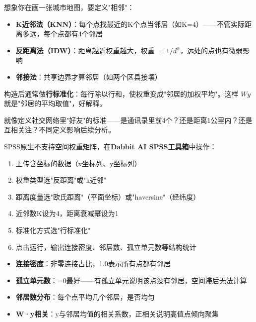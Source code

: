 \begin{algoprinciple}
想象你在画一张城市地图，要定义"相邻"：

\begin{itemize}
    \item \textbf{K近邻法（KNN）}：每个点找最近的K个点当邻居（如K=4）——不管实际距离多远，每个点都有4个邻居
    \item \textbf{反距离法（IDW）}：距离越近权重越大，权重 $=1/d^\alpha$，远处的点也有微弱影响
    \item \textbf{邻接法}：共享边界才算邻居（如两个区县接壤）
\end{itemize}

构造后通常做\textbf{行标准化}：每行除以行和，使权重变成"邻居的加权平均"。这样 $Wy$ 就是"邻居的平均取值"，好解释。

就像定义社交网络里"好友"的标准——是通讯录里前4个？还是距离1公里内？还是互相关注？不同定义影响后续分析。
\end{algoprinciple}

\begin{algosposs}
SPSS原生不支持空间权重矩阵，在\textbf{Dabbit AI SPSS工具箱}中操作：

\begin{enumerate}
    \item 上传含坐标的数据（x坐标列、y坐标列）
    \item 权重类型选"反距离"或"k近邻"
    \item 距离度量选"欧氏距离"（平面坐标）或"haversine"（经纬度）
    \item 近邻数K设为4，距离衰减幂设为1
    \item 标准化方式选"行标准化"
    \item 点击运行，输出连接密度、邻居数、孤立单元数等结构统计
\end{enumerate}
\end{algosposs}

\begin{algoresult}
\begin{itemize}
    \item \textbf{连接密度}：非零连接占比，1.0表示所有点都有邻居
    \item \textbf{孤立单元数}：=0最好——有孤立单元说明该点没有邻居，空间滞后无法计算
    \item \textbf{邻居数分布}：每个点平均几个邻居，是否均匀
    \item \textbf{W·y相关}：y与邻居均值的相关系数，正相关说明高值点倾向聚集
\end{itemize}
\end{algoresult}


